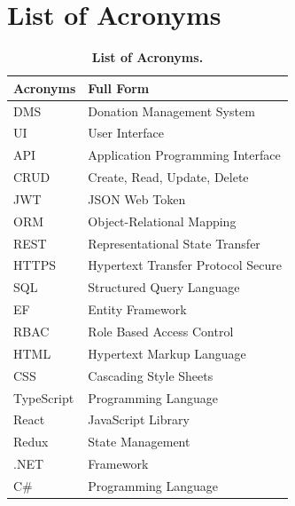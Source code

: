 \chapter*{List of Acronyms}
\vspace{-40pt}
\begin{table}[h]
    \renewcommand{\arraystretch}{1.6}
    \centering
    \caption{\textbf{List of Acronyms.}}
    \vspace{10pt}
    \begin{tabular}{|l|l|}
        \hline
        \textbf{Acronyms} & \textbf{Full Form} \\
        \hline
        DMS & Donation Management System\\
        UI & User Interface\\
        API & Application Programming Interface\\
        CRUD & Create, Read, Update, Delete\\
        JWT & JSON Web Token\\
        ORM & Object-Relational Mapping\\
        REST & Representational State Transfer\\
        HTTPS & Hypertext Transfer Protocol Secure\\
        SQL & Structured Query Language\\
        EF & Entity Framework\\
        RBAC & Role Based Access Control\\
        HTML & Hypertext Markup Language\\
        CSS & Cascading Style Sheets\\
        TypeScript & Programming Language\\
        React & JavaScript Library\\
        Redux & State Management\\
        .NET & Framework\\
        C\# & Programming Language\\
        \hline
    \end{tabular}
\end{table}

